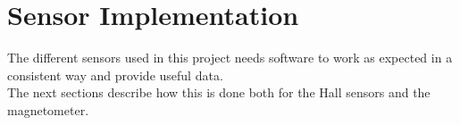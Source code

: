 \chapter{Sensor Implementation}\label{chap:sensorsImplementation}
The different sensors used in this project needs software to work as expected in a consistent way and provide useful data.\\
The next sections describe how this is done both for the Hall sensors and the magnetometer.